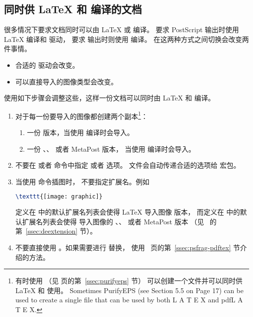 \subsection{同时供 \LaTeX{} 和 \pdfLaTeX{} 编译的文档 }\label{ssec:latexandpdflatex}
很多情况下要求文档同时可以由 \LaTeX{} 或 \pdfLaTeX{} 编译。
要求 PostScript 输出时使用 \LaTeX{} 编译和  驱动，
要求  输出时则使用 \pdfLaTeX{} 编译。
在这两种方式之间切换会改变两件事情。
\begin{itemize}
	\item 合适的  驱动会改变。
	\item 可以直接导入的图像类型会改变。
\end{itemize}
使用如下步骤会调整这些，这样一份文档可以同时由 \LaTeX{} 和 \pdfLaTeX{} 编译。
\begin{enumerate}
	\item 对于每一份要导入的图像都创建两个副本\footnote{
		有时使用  （见 \pageref{ssec:purifyeps} 页的第~\ref{ssec:purifyeps} 节） 可以创建一个文件并可以同时供 \LaTeX{} 和 \pdfLaTeX{} 使用。
		 Sometimes PurifyEPS (see Section 5.5 on Page 17) can be used to create a single file that can
		 be used by both L
		 A T E X and pdfL A T E X.}：
	\begin{enumerate}
		\item 一份  版本，当使用  编译时会导入。
		\item 一份 、、 或者 MetaPost 版本，
		当使用  编译时会导入。
	\end{enumerate}
	
	\item 不要在  或者  命令中指定  或者  选项。
	 文件会自动传递合适的选项给  宏包。
	
	\item 当使用  命令插图时，
	不要指定扩展名。例如
\begin{lstlisting}[language=LaTeX]
\texttt{[image: graphic]}
\end{lstlisting}
	定义在  中的默认扩展名列表会使得 \LaTeX{} 导入图像  版本，
	而定义在  中的默认扩展名列表会使得 \pdfLaTeX{} 导入图像的 、、 或者 MetaPost 版本
	（见~\pageref{ssec:deextension} 的第~\ref{ssec:deextension} 节）。
	
	\item 不要直接使用 。如果需要进行  替换，
	使用~\pageref{ssec:psfrag-pdftex} 页的第~\ref{ssec:psfrag-pdftex} 节介绍的方法。
\end{enumerate}

